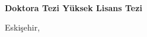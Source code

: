 \thispagestyle{empty} %
\vspace*{15.5cm}

\begin{spacing}{1.0}
\centering
\bf
\paramtitle \\
\if{}
Doktora Tezi
\else
Yüksek Lisans Tezi
\fi
\bigskip

\paramauthor
\bigskip

Eskişehir, \paramyear

\end{spacing}

\newpage
